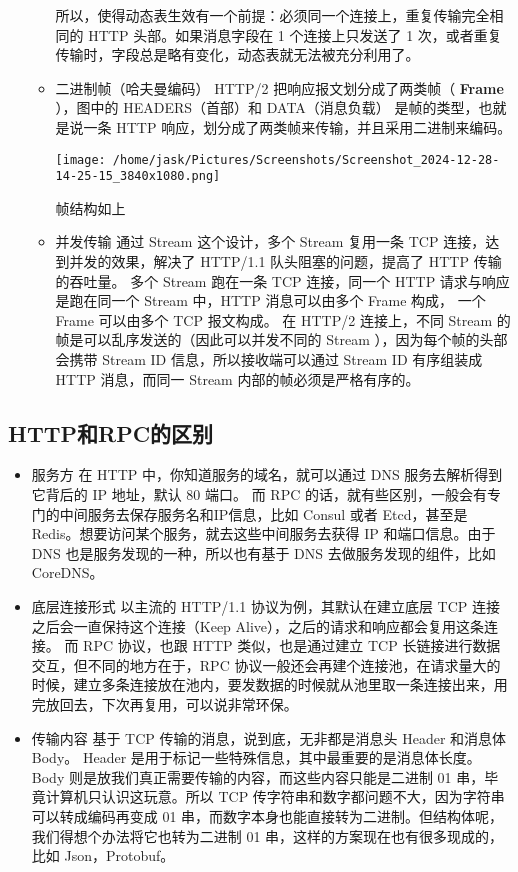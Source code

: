 \documentclass[11pt]{article}
\begin{document}
\begin{itemize}
\begin{itemize}
所以，使得动态表生效有一个前提：必须同一个连接上，重复传输完全相同的 HTTP 头部。如果消息字段在 1 个连接上只发送了 1 次，或者重复传输时，字段总是略有变化，动态表就无法被充分利用了。
\item 二进制帧（哈夫曼编码）
HTTP/2 把响应报文划分成了两类帧（ \textbf{Frame} ），图中的 HEADERS（首部）和 DATA（消息负载） 是帧的类型，也就是说一条 HTTP 响应，划分成了两类帧来传输，并且采用二进制来编码。
\begin{center}
\texttt{[image: /home/jask/Pictures/Screenshots/Screenshot\_2024-12-28-14-25-15\_3840x1080.png]}
\end{center}
帧结构如上
\item 并发传输
通过 Stream 这个设计，多个 Stream 复用一条 TCP 连接，达到并发的效果，解决了 HTTP/1.1 队头阻塞的问题，提高了 HTTP 传输的吞吐量。
多个 Stream 跑在一条 TCP 连接，同一个 HTTP 请求与响应是跑在同一个 Stream 中，HTTP 消息可以由多个 Frame 构成， 一个 Frame 可以由多个 TCP 报文构成。
在 HTTP/2 连接上，不同 Stream 的帧是可以乱序发送的（因此可以并发不同的 Stream ），因为每个帧的头部会携带 Stream ID 信息，所以接收端可以通过 Stream ID 有序组装成 HTTP 消息，而同一 Stream 内部的帧必须是严格有序的。
\end{itemize}
\end{itemize}
\subsection{HTTP和RPC的区别}
\label{sec:org2bbe404}
\begin{itemize}
\item 服务方
在 HTTP 中，你知道服务的域名，就可以通过 DNS 服务去解析得到它背后的 IP 地址，默认 80 端口。
而 RPC 的话，就有些区别，一般会有专门的中间服务去保存服务名和IP信息，比如 Consul 或者 Etcd，甚至是 Redis。想要访问某个服务，就去这些中间服务去获得 IP 和端口信息。由于 DNS 也是服务发现的一种，所以也有基于 DNS 去做服务发现的组件，比如CoreDNS。
\item 底层连接形式
以主流的 HTTP/1.1 协议为例，其默认在建立底层 TCP 连接之后会一直保持这个连接（Keep Alive），之后的请求和响应都会复用这条连接。
而 RPC 协议，也跟 HTTP 类似，也是通过建立 TCP 长链接进行数据交互，但不同的地方在于，RPC 协议一般还会再建个连接池，在请求量大的时候，建立多条连接放在池内，要发数据的时候就从池里取一条连接出来，用完放回去，下次再复用，可以说非常环保。
\item 传输内容
基于 TCP 传输的消息，说到底，无非都是消息头 Header 和消息体 Body。
Header 是用于标记一些特殊信息，其中最重要的是消息体长度。
Body 则是放我们真正需要传输的内容，而这些内容只能是二进制 01 串，毕竟计算机只认识这玩意。所以 TCP 传字符串和数字都问题不大，因为字符串可以转成编码再变成 01 串，而数字本身也能直接转为二进制。但结构体呢，我们得想个办法将它也转为二进制 01 串，这样的方案现在也有很多现成的，比如 Json，Protobuf。
\end{itemize}
\end{document}
